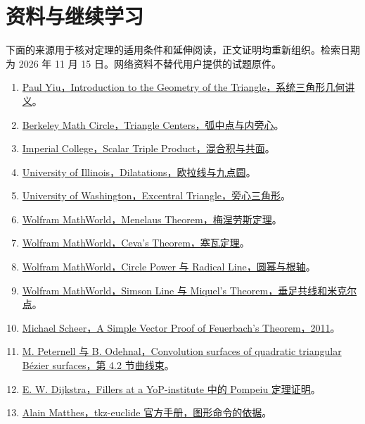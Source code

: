 \documentclass[lang=cn,12pt,fontset=none,a4paper,openany]{beautybook}
\begin{document}
\backmatter
\chapter{资料与继续学习}
下面的来源用于核对定理的适用条件和延伸阅读，正文证明均重新组织。检索日期为 2026 年 11 月 15 日。网络资料不替代用户提供的试题原件。
\begin{enumerate}
\item \href{https://users.math.uoc.gr/~pamfilos/Yiu.pdf}{Paul Yiu，Introduction to the Geometry of the Triangle，系统三角形几何讲义}。
\item \href{https://mathcircle.berkeley.edu/sites/default/files/archivedocs/2014_2015/lectures/1415lecturespdf/Int\%20II\%20-\%202015.01.20.pdf}{Berkeley Math Circle，Triangle Centers，弧中点与内旁心}。
\item \href{https://metric.ma.ic.ac.uk/metric_public/vectors/vector_coordinate_geometry/scalar_triple_product.html}{Imperial College，Scalar Triple Product，混合积与共面}。
\item \href{https://gkfweb.math.illinois.edu/oldnew/math403/public/dilatations/dilatations.html}{University of Illinois，Dilatations，欧拉线与九点圆}。
\item \href{https://sites.math.washington.edu/~king/coursedir/m444a04/class/class29.html}{University of Washington，Excentral Triangle，旁心三角形}。
\item \href{https://mathworld.wolfram.com/MenelausTheorem.html}{Wolfram MathWorld，Menelaus Theorem，梅涅劳斯定理}。
\item \href{https://mathworld.wolfram.com/CevasTheorem.html}{Wolfram MathWorld，Ceva's Theorem，塞瓦定理}。
\item \href{https://mathworld.wolfram.com/RadicalLine.html}{Wolfram MathWorld，Circle Power 与 Radical Line，圆幂与根轴}。
\item \href{https://mathworld.wolfram.com/SimsonLine.html}{Wolfram MathWorld，Simson Line 与 Miquel's Theorem，垂足共线和米克尔点}。
\item \href{https://arxiv.org/abs/1107.1152}{Michael Scheer，A Simple Vector Proof of Feuerbach's Theorem，2011}。
\item \href{https://www.geometrie.tuwien.ac.at/geom/ig/peternell/peternell_odehnal_rev2.pdf}{M. Peternell 与 B. Odehnal，Convolution surfaces of quadratic triangular Bézier surfaces，第 4.2 节曲线束}。
\item \href{https://www.cs.utexas.edu/~EWD/ewd10xx/EWD1017.PDF}{E. W. Dijkstra，Fillers at a YoP-institute 中的 Pompeiu 定理证明}。
\item \href{https://ctan.org/pkg/tkz-euclide}{Alain Matthes，tkz-euclide 官方手册，图形命令的依据}。
\end{enumerate}
\end{document}
